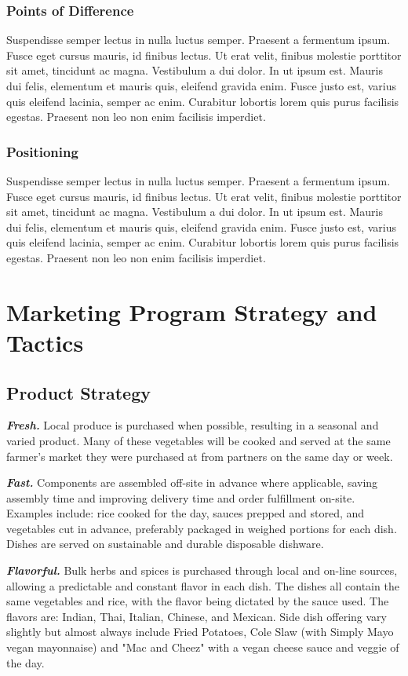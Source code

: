 \documentclass[12pt, letterpaper]{article}
\begin{document}
\subsubsection{Points of Difference}
Suspendisse semper lectus in nulla luctus semper. Praesent a fermentum ipsum. Fusce eget cursus mauris, id finibus lectus. Ut erat velit, finibus molestie porttitor sit amet, tincidunt ac magna. Vestibulum a dui dolor. In ut ipsum est. Mauris dui felis, elementum et mauris quis, eleifend gravida enim. Fusce justo est, varius quis eleifend lacinia, semper ac enim. Curabitur lobortis lorem quis purus facilisis egestas. Praesent non leo non enim facilisis imperdiet.
\subsubsection{Positioning}
Suspendisse semper lectus in nulla luctus semper. Praesent a fermentum ipsum. Fusce eget cursus mauris, id finibus lectus. Ut erat velit, finibus molestie porttitor sit amet, tincidunt ac magna. Vestibulum a dui dolor. In ut ipsum est. Mauris dui felis, elementum et mauris quis, eleifend gravida enim. Fusce justo est, varius quis eleifend lacinia, semper ac enim. Curabitur lobortis lorem quis purus facilisis egestas. Praesent non leo non enim facilisis imperdiet.

\section{Marketing Program Strategy and Tactics}
\subsection{Product Strategy}
\textbf{\emph{Fresh.}} Local produce is purchased when possible, resulting in a seasonal and varied product. Many of these vegetables will be cooked and served at the same farmer's market they were purchased at from partners on the same day or week.

\textbf{\emph{Fast.}} Components are assembled off-site in advance where applicable, saving assembly time and improving delivery time and order fulfillment on-site. Examples include: rice cooked for the day, sauces prepped and stored, and vegetables cut in advance, preferably packaged in weighed portions for each dish. Dishes are served on sustainable and durable disposable dishware.

\textbf{\emph{Flavorful.}} Bulk herbs and spices is purchased through local and on-line sources, allowing a predictable and constant flavor in each dish.  The dishes  all contain the same vegetables and rice, with the flavor being dictated by the sauce used.  The flavors are: Indian, Thai, Italian, Chinese, and Mexican. Side dish offering vary slightly but almost always include Fried Potatoes, Cole Slaw (with Simply Mayo\textregistered{} vegan mayonnaise) and "Mac and Cheez" with a vegan cheese sauce and veggie of the day.
\end{document}
